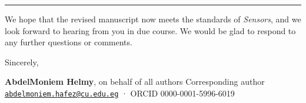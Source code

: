 \documentclass[
  11pt,
]{article}
\begin{document}
\begin{center}\rule{0.5\linewidth}{0.5pt}\end{center}

We hope that the revised manuscript now meets the standards of
\emph{Sensors}, and we look forward to hearing from you in due course.
We would be glad to respond to any further questions or comments.

Sincerely,

\textbf{AbdelMoniem Helmy}, on behalf of all authors Corresponding
author
\href{mailto:abdelmoniem.hafez@cu.edu.eg}{\nolinkurl{abdelmoniem.hafez@cu.edu.eg}}
· ORCID 0000-0001-5996-6019
\end{document}
